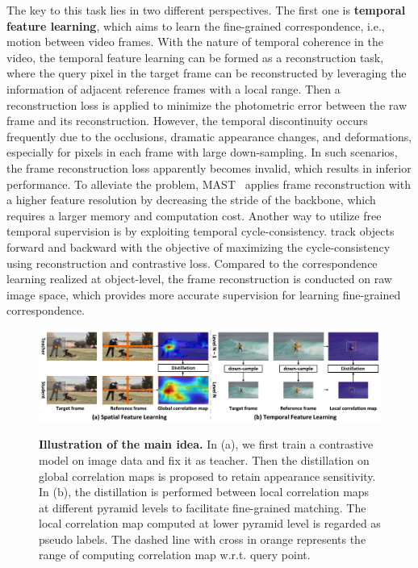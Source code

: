 \documentclass{article}
\begin{document}
The key to this task lies in two different perspectives. The first one is \textbf{temporal feature learning}, which aims to learn the fine-grained correspondence, i.e., motion between video frames. With the nature of temporal coherence in the video, the temporal feature learning can be formed as a reconstruction task, where the query pixel in the target frame can be reconstructed by leveraging the information of adjacent reference frames with a local range. Then a reconstruction loss is applied to minimize the photometric error between the raw frame and its reconstruction. However, the temporal discontinuity occurs frequently due to the occlusions, dramatic appearance changes, and deformations, especially for pixels in each frame with large down-sampling. In such scenarios, the frame reconstruction loss apparently becomes invalid, which results in inferior performance. To alleviate the problem, MAST~\cite{lai2020mast} applies frame reconstruction with a higher feature resolution by decreasing the stride of the backbone, which requires a larger memory and computation cost. Another way to utilize free temporal supervision is by exploiting temporal cycle-consistency.  \cite{jabri2020space}\cite{wang2019learning} track objects forward and backward with the objective of maximizing the cycle-consistency using  reconstruction and contrastive loss. Compared to the correspondence learning realized at object-level, the frame reconstruction is conducted on raw image space, which provides more accurate supervision for learning fine-grained correspondence.

\begin{figure}[!tb]
  \centering
  {\includegraphics[width=1.0\textwidth]{figure/tissor/tissor.pdf}}
  \caption{\small \textbf{Illustration of the main idea.} In (a), we first train a contrastive model on image data and fix it as teacher. Then the distillation on global correlation maps is proposed to retain appearance sensitivity. In (b), the distillation is performed between local correlation maps at different pyramid levels to facilitate fine-grained matching. The local correlation map computed at lower pyramid level is regarded as pseudo labels. The dashed line with cross in orange represents the range of computing correlation map w.r.t. query point.}
  \label{fig:tissor}
  \vspace{-7mm}
\end{figure}
\end{document}
